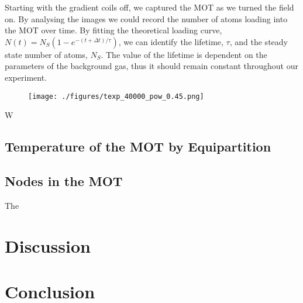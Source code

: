 \documentclass[12pt,twoside]{article}
\begin{document}
Starting with the gradient coils off, we captured the MOT as we turned the field on. By analysing the images we could record the number of atoms loading into the MOT over time. By fitting the theoretical loading curve, $N(t)=N_S \left(1-e^{-(t+\Delta t)/\tau}\right)$, we can identify the lifetime, $\tau$, and the steady state number of atoms, $N_S$. The value of the lifetime is dependent on the parameters of the background gas, thus it should remain constant throughout our experiment. 


\begin{figure}[h]
    \centering
    \texttt{[image: ./figures/texp\_40000\_pow\_0.45.png]}
    \caption{}
    \label{fig:CamCalib}
\end{figure}

W

\section{Temperature of the MOT by Equipartition}

\section{Nodes in the MOT}


\hspace{10pt}The 







\chapter{Discussion}










\chapter{Conclusion}



\end{document}
